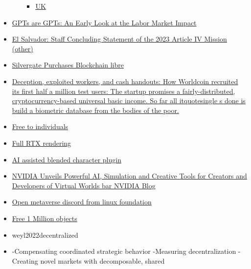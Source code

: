 \begin{itemize}
\begin{itemize}
\begin{itemize}
    \item
      \href{https://www.gov.uk/government/news/uk-sets-out-plans-to-regulate-crypto-and-protect-consumers}{UK}
    \end{itemize}
  \end{itemize}
\item
  \href{https://arxiv.org/abs/2303.10130}{GPTs are GPTs: An Early Look
  at the Labor Market Impact}
\item
  \href{https://www.imf.org/en/News/Articles/2023/02/10/el-salvador-staff-concluding-statement-of-the-2023-article-iv-mission}{El
  Salvador: Staff Concluding Statement of the 2023 Article IV Mission
  (other)}
\item
  \href{https://ir.silvergate.com/news/news-details/2022/Silvergate-Purchases-Blockchain-Payment-Network-Assets-from-Diem/default.aspx}{Silvergate
  Purchases Blockchain libre}
\item
  \href{https://www.technologyreview.com/2022/04/06/1048981/worldcoin-cryptocurrency-biometrics-web3/}{Deception,
  exploited workers, and cash handouts: How Worldcoin recruited its
  first half a million test users: The startup promises a
  fairly-distributed, cryptocurrency-based universal basic income. So
  far all itquotesingle s done is build a biometric database from
  the bodies of the poor.}
\item
  \href{https://blogs.nvidia.com/blog/2022/01/04/omniverse-available-free-to-creators/}{Free
  to individuals}
\item
  \href{https://www.youtube.com/watch?v=Jm155QkRjl0\&feature=youtu.be}{Full
  RTX rendering}
\item
  \href{https://blogs.nvidia.com/blog/2023/02/15/blender-alpha-release-omniverse/?ncid=so-link-466434\#cid=ov01_so-link_en-us}{AI
  assisted blended character plugin}
\item
  \href{https://blogs.nvidia.com/blog/2022/08/09/omniverse-siggraph/}{NVIDIA
  Unveils Powerful AI, Simulation and Creative Tools for Creators and
  Developers of Virtual Worlds bar{} NVIDIA Blog}
\item
  \href{https://discord.gg/openmetaverse}{Open metaverse discord from
  linux foundation}
\item
  \href{https://huggingface.co/datasets/allenai/objaverse}{Free 1
  Million objects}
\item
  weyl2022decentralized
\item
  -Compensating coordinated strategic behavior -Measuring
  decentralization -Creating novel markets with decomposable, shared

\end{itemize}
